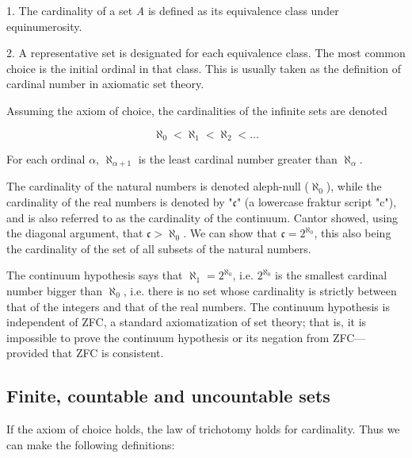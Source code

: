 1.  The cardinality of a set \textit{A} is defined as its equivalence class under equinumerosity.

2.  A representative set is designated for each equivalence class. The most common choice
is the initial ordinal in that class. This is usually taken as the definition of cardinal
number in axiomatic set theory.



Assuming the axiom of choice, the cardinalities of the infinite sets are denoted



$$\aleph _0 < \aleph _1 < \aleph _2 < \ldots$$



For each ordinal $\alpha$, $\aleph _{\alpha + 1}$ is the least cardinal number greater
than $\aleph _\alpha$.



The cardinality of the natural numbers is denoted aleph-null ($\aleph _0$), while the
cardinality of the real numbers is denoted by "$\mathfrak c$" (a lowercase fraktur script
"c"), and is also referred to as the cardinality of the continuum. Cantor showed, using
the diagonal argument, that ${\mathfrak c} >\aleph _0$. We can show that $\mathfrak c =
2^{\aleph _0}$, this also being the cardinality of the set of all subsets of the natural
numbers.



The continuum hypothesis says that $\aleph _1 = 2^{\aleph _0}$, i.e. $2^{\aleph _0}$ is
the smallest cardinal number bigger than $\aleph _0$, i.e. there is no set whose
cardinality is strictly between that of the integers and that of the real numbers. The
continuum hypothesis is independent of ZFC, a standard axiomatization of set theory; that
is, it is impossible to prove the continuum hypothesis or its negation from ZFC—provided
that ZFC is consistent.




\subsection{Finite, countable and uncountable sets}
\label{sss:fini-9354}




If the axiom of choice holds, the law of trichotomy holds for cardinality. Thus we can
make the following definitions:



